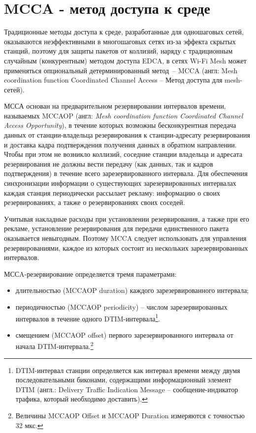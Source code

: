 \section{MCCA - метод доступа к среде}

Традиционные методы доступа к среде, разработанные для одношаговых сетей, оказываются неэффективными в многошаговых сетях из-за эффекта скрытых станций, поэтому для защиты пакетов от коллизий, наряду с традиционным случайным (конкурентным) методом доступа EDCA, в сетях  Wi-Fi Mesh может применяться опциональный детерминированный метод~-- MCCA (англ: Mesh coordination function Coordinated Channel Access -- Метод доступа для mesh-сетей).

МССА основан на предварительном резервировании интервалов времени, называемых MCCAOP (англ: \emph{Mesh coordination function Coordinated Channel Access Opportunity}), в течение которых  возможны бесконкурентная передача данных от станции-владельца резервирования к станции-адресату резервирования и доставка кадра подтверждения получения данных в обратном направлении. Чтобы при этом не возникло коллизий, соседние станции владельца и адресата резервирования не должны вести передачу (как данных, так и кадров подтверждения) в течение всего зарезервированного интервала. Для обеспечения синхронизации информации о существующих зарезервированных интервалах каждая станция периодически рассылает рекламу: информацию о своих резервированиях, а также о резервированиях своих соседей.

Учитывая накладные расходы при установлении резервирования, а также при его рекламе, установление резервирования для передачи единственного пакета оказывается невыгодным. Поэтому MCCA следует использовать для управления резервированиями, каждое из которых состоит из нескольких зарезервированных интервалов.

МССA-резервирование определяется тремя параметрами:
\begin{itemize}
 \item длительностью (MCCAOP duration) каждого зарезервированного интервала;
 \item периодичностью (MCCAOP periodicity) -- числом зарезервированных интервалов в течение одного DTIM-интервала\footnote{DTIM-интервал станции определяется как интервал времени между двумя последовательными биконами, содержащими информационный элемент DTIM (англ.:  Delivery Traffic Indication Message -- сообщение-индикатор трафика, который необходимо доставить).}.
 \item смещением (MCCAOP offset) первого зарезервированного интервала от начала DTIM-интервала.\footnote{Величины MCCAOP Offset и MCCAOP Duration измеряются с точностью 32 мкс.}
\end{itemize}

